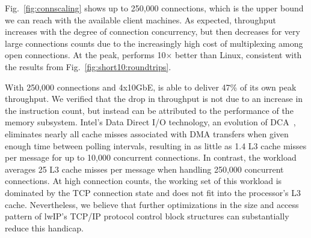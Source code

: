 


Fig.~\ref{fig:connscaling} shows up to 250,000
connections, which is the upper bound we can reach with the available
client machines.  As expected, throughput increases with the degree of
connection concurrency, but then decreases for very large connections
counts due to the increasingly high cost of multiplexing among open
connections.  At the peak, \ix performs 10$\times$ better than
Linux, consistent with the results from
Fig.~\ref{fig:short10:roundtrips}.

With 250,000 connections and 4x10GbE, \ix is able to deliver
47\% of its own peak throughput.  We verified that the drop
in throughput is not due to an increase in the instruction count, but
instead can be attributed to the performance of the memory
subsystem. Intel's Data Direct I/O technology, an evolution of
DCA~\cite{DBLP:conf/isca/HuggahalliIT05}, eliminates nearly all cache
misses associated with DMA transfers when given enough time between
polling intervals, resulting in as little as 1.4 L3 cache misses per
message for up to 10,000 concurrent connections.  In contrast, the
workload averages 25 L3 cache misses per message when handling 250,000
concurrent connections.  At high connection counts, the working set of
this workload is dominated by the TCP connection state and does not
fit into the processor's L3 cache.  Nevertheless, we believe that
further optimizations in the size and access pattern of lwIP's TCP/IP
protocol control block structures can substantially reduce this
handicap.
  



